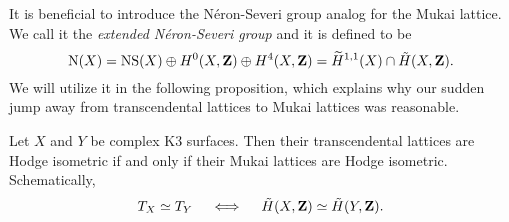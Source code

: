 It is beneficial to introduce the Néron-Severi group analog for the Mukai lattice. We call it the \emph{extended Néron-Severi group} and it is defined to be 
\[
    \operatorname{N}(X) = \operatorname{NS}(X) \oplus H^{0}(X, \mathbf Z) \oplus H^{4}(X, \mathbf Z) = \widetilde{H}^{1,1}(X) \cap \,\tilde{\!{H}}(X, \mathbf Z).
\]  
We will utilize it in the following proposition, which explains why our sudden jump away from transcendental lattices to Mukai lattices was reasonable. 
\begin{proposition}
    \label{transcendental iso iff Mukai iso}
    Let $X$ and $Y$ be complex K3 surfaces. Then their transcendental lattices are Hodge isometric if and only if their Mukai lattices are Hodge isometric. Schematically,
    \[
        T_{X} \simeq T_{Y} \quad \iff \quad \,\tilde{\!{H}}(X, \mathbf Z) \simeq \,\tilde{\!{H}}(Y, \mathbf Z).
    \]
\end{proposition}

